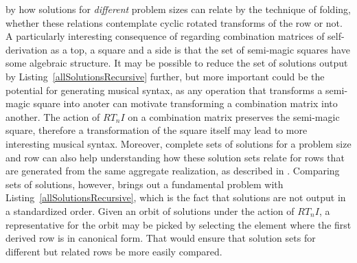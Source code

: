 by how solutions for \emph{different} problem sizes can relate by the technique of folding, whether these relations contemplate cyclic rotated transforms of the row or not. A particularly interesting consequence of regarding combination matrices of self-derivation as a top, a square and a side is that the set of semi-magic squares have some algebraic structure. It may be possible to reduce the set of solutions output by Listing~\ref{allSolutionsRecursive} further, but more important could be the potential for generating musical syntax, as any operation that transforms a semi-magic square into anoter can motivate transforming a combination matrix into another. The action of $RT_nI$ on a combination matrix preserves the semi-magic square, therefore a transformation of the square itself may lead to more interesting musical syntax. Moreover, complete sets of solutions for a problem size and row can also help understanding how these solution sets relate for rows that are generated from the same aggregate realization, as described in \cite{Starr1984}. Comparing sets of solutions, however, brings out a fundamental problem with Listing~\ref{allSolutionsRecursive}, which is the fact that solutions are not output in a standardized order. Given an orbit of solutions under the action of $RT_nI$, a representative for the orbit may be picked by selecting the element where the first derived row is in canonical form. That would ensure that solution sets for different but related rows be more easily compared.

